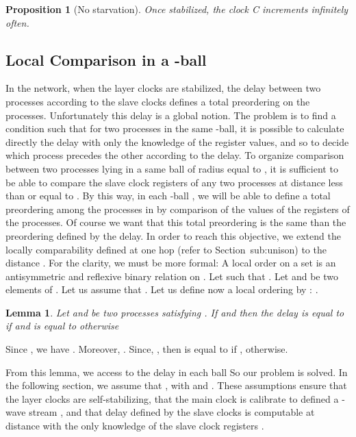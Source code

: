 \documentclass[11pt]{article}
\newenvironment{proof}{{\bf Proof. } }{{\hfill }\vspace{.5pc}}
\newtheorem{lemma}[theorem]{Lemma}
\newtheorem{proposition}[theorem]{Proposition}
\begin{document}
\begin{proposition}[No starvation]
\label{prop:nos}
Once stabilized, the clock \emph{C} increments infinitely often.
\end{proposition}


\subsection{Local Comparison in a -ball}

In the network, when the layer clocks are  stabilized, the delay between two processes according to the slave clocks   defines a total preordering  on the processes. 
Unfortunately this delay is a global notion. The problem is to
find a condition such that for two processes in the same -ball, it is
possible  to calculate directly the delay with only the knowledge of the  register values, and so to decide which process precedes the other
according to the delay. 
To organize comparison between two processes lying  in a same ball of radius
equal to , it is sufficient to be able to compare the slave clock
registers  of any two  processes at distance less than or equal to . By
this way,  in each -ball , we will be able to define a total
preordering among the processes in  by comparison of the values of the
registers  of the processes. Of course we want that this total
preordering is the same than the preordering defined by the delay.
In order to reach this objective, we extend the locally comparability defined at one hop (refer to Section~{sub:unison}) 
to the distance .  For the clarity, we must be
more formal:
A local order on a set  is an antisymmetric and reflexive binary
relation on .
Let  such that . 
Let  and  be two elements of . Let us assume that . Let us define now a local ordering   by : 
.


\begin{lemma}
Let  and  be two processes satisfying  . If  and  then the delay  is
equal to  if  and is
equal to  otherwise
\end{lemma}

\begin{proof}
Since , we have .  Moreover, .  Since, , 
then  is equal to  if ,  otherwise.
\end{proof}

From this lemma, we access to the delay in each ball  So our
problem is solved. 
In the following section, we assume that ,  with  and . These assumptions ensure 
that the layer clocks are self-stabilizing, that the main clock is calibrate to defined a -wave stream , and that delay defined by the
slave clocks is computable at distance  with the only knowledge of
the  slave clock registers .
\end{document}
